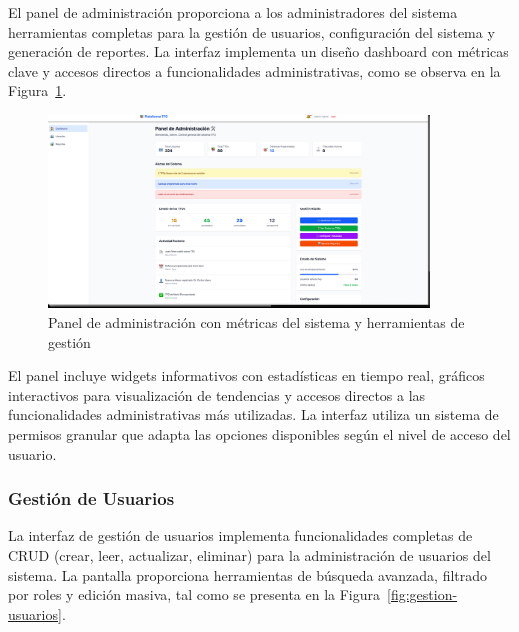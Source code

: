 \documentclass[12pt,a4paper,oneside]{report}
\begin{document}
El panel de administración proporciona a los administradores del sistema herramientas completas para la gestión de usuarios, configuración del sistema y generación de reportes. La interfaz implementa un diseño dashboard con métricas clave y accesos directos a funcionalidades administrativas, como se observa en la Figura~\ref{fig:panel-administracion}.

\begin{figure}[H]
\centering
\includegraphics[width=0.9\textwidth]{processed/images/panel_administracion.png}
\caption{Panel de administración con métricas del sistema y herramientas de gestión}
\label{fig:panel-administracion}
\end{figure}

El panel incluye widgets informativos con estadísticas en tiempo real, gráficos interactivos para visualización de tendencias y accesos directos a las funcionalidades administrativas más utilizadas. La interfaz utiliza un sistema de permisos granular que adapta las opciones disponibles según el nivel de acceso del usuario.

\subsubsection{Gestión de Usuarios}\label{gestion-de-usuarios}

La interfaz de gestión de usuarios implementa funcionalidades completas de CRUD (crear, leer, actualizar, eliminar) para la administración de usuarios del sistema. La pantalla proporciona herramientas de búsqueda avanzada, filtrado por roles y edición masiva, tal como se presenta en la Figura~\ref{fig:gestion-usuarios}.
\end{document}
